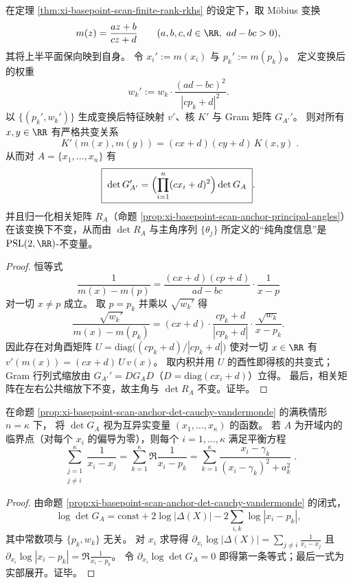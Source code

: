 \begin{proposition}\label{prop:xi-basepoint-scan-psl2r-covariance}
在定理 \ref{thm:xi-basepoint-scan-finite-rank-rkhs} 的设定下，取 Möbius 变换
\[
m(z)=\frac{az+b}{cz+d}\qquad(a,b,c,d\in\RR,\ ad-bc>0),
\]
其将上半平面保向映到自身。
令 \(x_i':=m(x_i)\) 与 \(p_k':=m(p_k)\)。
定义变换后的权重
\[
w_k':=w_k\cdot\frac{(ad-bc)^2}{|cp_k+d|^2}.
\]
以 \(\{(p_k',w_k')\}\) 生成变换后特征映射 \(v'\)、核 \(K'\) 与 Gram 矩阵 \(G_{A'}'\)。
则对所有 \(x,y\in\RR\) 有严格共变关系
\[
\boxed{\;
K'(m(x),m(y))=(cx+d)(cy+d)\,K(x,y)\; }.
\]
从而对 \(A=\{x_1,\dots,x_n\}\) 有
\[
\boxed{\;
\det G_{A'}'=\Bigl(\prod_{i=1}^{n}(cx_i+d)^2\Bigr)\det G_A\; }.
\]
并且归一化相关矩阵 \(R_A\)（命题 \ref{prop:xi-basepoint-scan-anchor-principal-angles}）在该变换下不变，从而由 \(\det R_A\) 与主角序列 \(\{\theta_j\}\) 所定义的“纯角度信息”是 \(\mathrm{PSL}(2,\RR)\)-不变量。
\end{proposition}
\begin{proof}
恒等式
\[
\frac{1}{m(x)-m(p)}=\frac{(cx+d)(cp+d)}{ad-bc}\cdot\frac{1}{x-p}
\]
对一切 \(x\neq p\) 成立。
取 \(p=p_k\) 并乘以 \(\sqrt{w_k'}\) 得
\[
\frac{\sqrt{w_k'}}{m(x)-m(p_k)}
=(cx+d)\cdot \frac{cp_k+d}{|cp_k+d|}\cdot \frac{\sqrt{w_k}}{x-p_k}.
\]
因此存在对角酉矩阵 \(U=\mathrm{diag}\bigl((cp_k+d)/|cp_k+d|\bigr)\) 使对一切 \(x\in\RR\) 有
\(
v'(m(x))=(cx+d)\,U\,v(x)
\)。
取内积并用 \(U\) 的酉性即得核的共变式；Gram 行列式缩放由 \(G_{A'}'=D G_A D\)（\(D=\mathrm{diag}(cx_i+d)\)）立得。
最后，相关矩阵在左右公共缩放下不变，故主角与 \(\det R_A\) 不变。证毕。
\end{proof}

\begin{proposition}\label{prop:xi-basepoint-scan-full-rank-anchor-critical-equations}
在命题 \ref{prop:xi-basepoint-scan-anchor-det-cauchy-vandermonde} 的满秩情形 \(n=\kappa\) 下，
将 \(\det G_A\) 视为互异实变量 \((x_1,\dots,x_\kappa)\) 的函数。
若 \(A\) 为开域内的临界点（对每个 \(x_i\) 的偏导为零），则每个 \(i=1,\dots,\kappa\) 满足平衡方程
\[
\boxed{\;
\sum_{\substack{j=1\\ j\ne i}}^{\kappa}\frac{1}{x_i-x_j}
=\sum_{k=1}^{\kappa}\Re\frac{1}{x_i-p_k}
=\sum_{k=1}^{\kappa}\frac{x_i-\gamma_k}{(x_i-\gamma_k)^2+a_k^2}\; }.
\]
\end{proposition}
\begin{proof}
由命题 \ref{prop:xi-basepoint-scan-anchor-det-cauchy-vandermonde} 的闭式，
\[
\log\det G_A=\mathrm{const}+2\log|\Delta(X)|-2\sum_{i,k}\log|x_i-p_k|,
\]
其中常数项与 \(\{p_k,w_k\}\) 无关。
对 \(x_i\) 求导得
\(
\partial_{x_i}\log|\Delta(X)|=\sum_{j\ne i}\frac{1}{x_i-x_j}
\)
且
\(
\partial_{x_i}\log|x_i-p_k|=\Re\frac{1}{x_i-p_k}
\)。
令 \(\partial_{x_i}\log\det G_A=0\) 即得第一条等式；最后一式为实部展开。证毕。
\end{proof}

